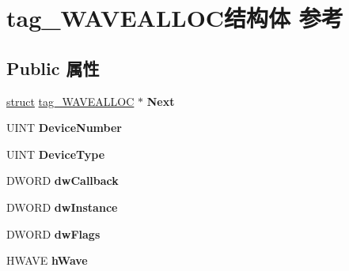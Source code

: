 \hypertarget{structtag___w_a_v_e_a_l_l_o_c}{}\section{tag\+\_\+\+W\+A\+V\+E\+A\+L\+L\+O\+C结构体 参考}
\label{structtag___w_a_v_e_a_l_l_o_c}
\subsection*{Public 属性}
\begin{DoxyCompactItemize}
\item 
\mbox{\label{structtag___w_a_v_e_a_l_l_o_c_ae12e3ae4e46baa612f98184750105661}} 
\hyperlink{interfacestruct}{struct} \hyperlink{structtag___w_a_v_e_a_l_l_o_c}{tag\+\_\+\+W\+A\+V\+E\+A\+L\+L\+OC} $\ast$ {\bfseries Next}
\item 
\mbox{\label{structtag___w_a_v_e_a_l_l_o_c_a05d6d75f7fec8ad408954b204a6adce5}} 
U\+I\+NT {\bfseries Device\+Number}
\item 
\mbox{\label{structtag___w_a_v_e_a_l_l_o_c_a1c29e081a6438119f894ed77e02025b8}} 
U\+I\+NT {\bfseries Device\+Type}
\item 
\mbox{\label{structtag___w_a_v_e_a_l_l_o_c_a7828af73ad465fcb33afe268525d93d4}} 
D\+W\+O\+RD {\bfseries dw\+Callback}
\item 
\mbox{\label{structtag___w_a_v_e_a_l_l_o_c_a671eb3bbdb6feb5b01d80cdd8ba6c9f8}} 
D\+W\+O\+RD {\bfseries dw\+Instance}
\item 
\mbox{\label{structtag___w_a_v_e_a_l_l_o_c_afe32584b7b32aaa371a46eb346b9b2cc}} 
D\+W\+O\+RD {\bfseries dw\+Flags}
\item 
\mbox{\label{structtag___w_a_v_e_a_l_l_o_c_a0d42af6b12a7343e8ab917dce93d157b}} 
H\+W\+A\+VE {\bfseries h\+Wave}
\item 
\mbox{\label{structtag___w_a_v_e_a_l_l_o_c_a3f1a7862b4801384ebf110a3035bca9b}} 

\end{DoxyCompactItemize}
